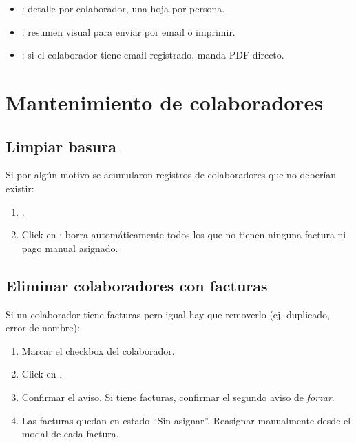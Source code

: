 \documentclass[11pt,a4paper]{article}
\begin{document}
\begin{itemize}
  \item {}: detalle por colaborador, una hoja por persona.
  \item {}: resumen visual para enviar por email o imprimir.
  \item {}: si el colaborador tiene email registrado, manda PDF directo.
\end{itemize}

\section{Mantenimiento de colaboradores}

\subsection{Limpiar basura}

Si por algún motivo se acumularon registros de colaboradores que no deberían existir:

\begin{enumerate}
  \item {}.
  \item Click en : borra automáticamente todos los que no tienen ninguna factura ni pago manual asignado.
\end{enumerate}

\subsection{Eliminar colaboradores con facturas}

Si un colaborador tiene facturas pero igual hay que removerlo (ej. duplicado, error de nombre):

\begin{enumerate}
  \item Marcar el checkbox del colaborador.
  \item Click en .
  \item Confirmar el aviso. Si tiene facturas, confirmar el segundo aviso de \textit{forzar}.
  \item Las facturas quedan en estado ``Sin asignar''. Reasignar manualmente desde el modal de cada factura.
\end{enumerate}
\end{document}
